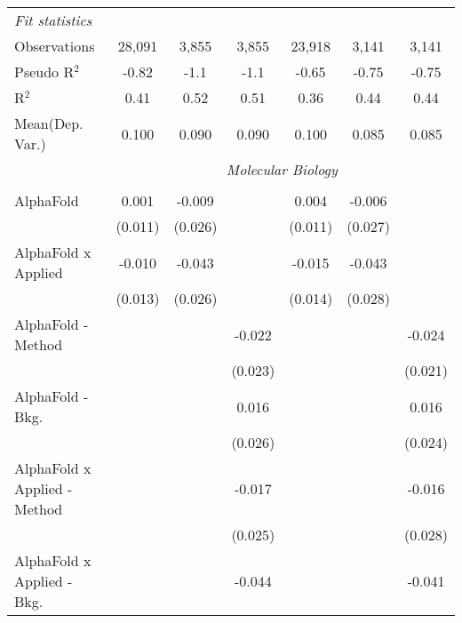 \begin{tabular}{lcccccc}
   \midrule
   \emph{Fit statistics}\\
   Observations                   & 28,091      & 3,855         & 3,855        & 23,918      & 3,141       & 3,141\\  
   Pseudo R$^2$                   & -0.82       & -1.1          & -1.1         & -0.65       & -0.75       & -0.75\\  
   R$^2$                          & 0.41        & 0.52          & 0.51         & 0.36        & 0.44        & 0.44\\  
Mean(Dep. Var.) & 0.100 & 0.090 & 0.090 & 0.100 & 0.085 & 0.085 \\
   
 & \multicolumn{6}{c}{\textit{Molecular Biology}} \\ \\
   AlphaFold                      & 0.001       & -0.009        &                & 0.004        & -0.006        &   \\   
                                  & (0.011)     & (0.026)       &                & (0.011)      & (0.027)       &   \\   
   AlphaFold x Applied            & -0.010      & -0.043        &                & -0.015       & -0.043        &   \\   
                                  & (0.013)     & (0.026)       &                & (0.014)      & (0.028)       &   \\   
   AlphaFold - Method             &             &               & -0.022         &              &               & -0.024\\   
                                  &             &               & (0.023)        &              &               & (0.021)\\   
   AlphaFold - Bkg.               &             &               & 0.016          &              &               & 0.016\\   
                                  &             &               & (0.026)        &              &               & (0.024)\\   
   AlphaFold x Applied - Method   &             &               & -0.017         &              &               & -0.016\\   
                                  &             &               & (0.025)        &              &               & (0.028)\\   
   AlphaFold x Applied - Bkg.     &             &               & -0.044         &              &               & -0.041\\   

\end{tabular}
